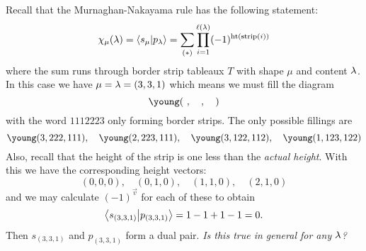 \documentclass[12pt]{memoir}
\begin{document}
\begin{ptcbr}
    Recall that the Murnaghan-Nakayama rule has the following statement:
    $$\chi_\mu(\lambda)=\braket{s_\mu}{p_\lambda}=\sum_{(\ast)}\prod_{i=1}^{\ell(\lambda)}(-1)^{\operatorname{ht}(\text{strip}(i))}$$
    where the sum runs through border strip tableaux $T$ with shape $\mu$ and content $\lambda$. In this case we have $\mu=\lambda=(3,3,1)$ which means we must fill the diagram
    $$\young(~,~~~,~~~)$$
    with the word $1112223$ only forming border strips. The only possible fillings are 
    $$\young(3,222,111),\quad\young(2,223,111),\quad\young(3,122,112),\quad\young(1,123,122)$$
    Also, recall that the height of the strip is one less than the \emph{actual height}. With this we have the corresponding height vectors:
    $$(0,0,0),\quad(0,1,0),\quad(1,1,0),\quad(2,1,0)$$
    and we may calculate $(-1)^\vec{v}$ for each of these to obtain 
    $$\braket{s_{(3,3,1)}}{p_{(3,3,1)}}=1-1+1-1=0.$$
    Then $s_{(3,3,1)}$ and $p_{(3,3,1)}$ form a dual pair. \emph{Is this true in general for any $\lambda$?}

\end{ptcbr}
\end{document}
